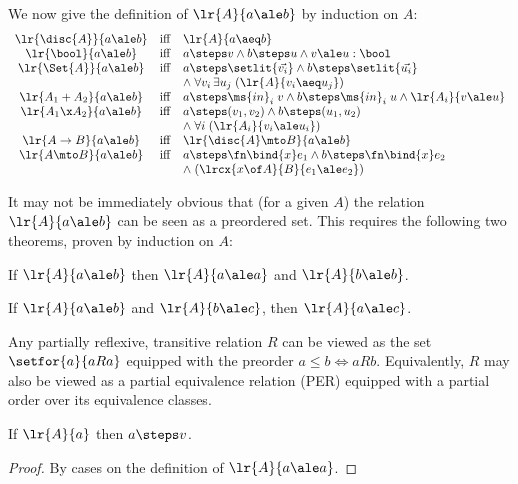 We now give the definition of $\lr{A}{a \ale b}$ by induction on $A$:
\[\begin{array}{ccl}
  \lr{\disc{A}}{a \ale b} &\tiff& \lr{A}{a \aeq b}\\
  \lr{\bool}{a \ale b} &\tiff&
  a \steps v \land b \steps u \land v \ale u : \bool\\
  \lr{\Set{A}}{a \ale b} &\tiff&
  a \steps \setlit{\vec{v_i}} \land b \steps \setlit{\vec{u_i}}\\
  && \mathrel{\land} \forall v_i\,\exists u_j\; (\lr{A}{v_i \aeq u_j})\\
  \lr{A_1 + A_2}{a \ale b} &\tiff&
  a \steps \ms{in}_i\;v \land b \steps \ms{in}_i\;u \land \lr{A_i}{v \ale u}\\
  \lr{A_1 \x A_2}{a \ale b} &\tiff&
  a \steps (v_1, v_2) \land b \steps (u_1, u_2)\\
  && \mathrel{\land} \forall i\; (\lr{A_i}{v_i \ale u_i})\\
  \lr{A \to B}{a \ale b} &\tiff& \lr{\disc{A} \mto B}{a \ale b}\\
  \lr{A \mto B}{a \ale b} &\tiff&
  a \steps \fn\bind{x} e_1 \land b \steps \fn\bind{x} e_2\\
  && \mathrel{\land} (\lrcx{x\of A}{B}{e_1 \ale e_2})
\end{array}\]

It may not be immediately obvious that (for a given $A$) the relation $\lr{A}{a
  \ale b}$ can be seen as a preordered set. This requires the following two
theorems, proven by induction on $A$:

\begin{theorem}
  If $\lr{A}{a \ale b}$ then $\lr{A}{a \ale a}$ and $\lr{A}{b \ale b}$.
\end{theorem}

\begin{theorem}[Transitivity]
  If $\lr{A}{a \ale b}$ and $\lr{A}{b \ale c}$, then $\lr{A}{a \ale c}$.
\end{theorem}

Any partially reflexive, transitive relation $R$ can be viewed as the set
$\setfor{a}{aRa}$ equipped with the preorder $a \le b \iff
aRb$. Equivalently, $R$ may also be viewed as a partial
  equivalence relation (PER) equipped with a partial order over its equivalence
  classes.

\begin{theorem}[Termination]
  If $\lr{A}{a}$ then $a \steps v$.
\end{theorem}
\begin{proof}
  By cases on the definition of $\lr{A}{a \ale a}$.
\end{proof}

